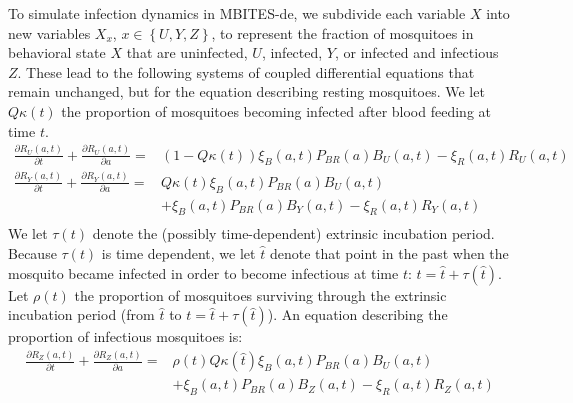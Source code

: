 \documentclass{article}
\begin{document}
To simulate infection dynamics in MBITES-de, we subdivide each variable $X$ into new variables $X_x$, $x \in \left\{ U, Y, Z \right\}$, to represent the fraction of mosquitoes in behavioral state $X$ that are uninfected, $U$, infected, $Y$, or infected and infectious $Z$.  These lead to the following systems of coupled differential equations that remain unchanged, but for the equation describing resting mosquitoes. We let  $Q\kappa(t)$ the proportion of mosquitoes becoming infected after blood feeding at time $t$. 
%
\begin{equation}\begin{array}{rl}
%
\frac{\partial R_U(a,t)}{\partial t} + \frac{\partial
R_U(a,t)}{\partial a} =& \left(1-Q \kappa(t) \right) \xi_B(a,t) P_{BR}(a) B_U(a,t)
- \xi_R(a,t) R_U(a,t)\\

\frac{\partial R_Y(a,t)}{\partial t} + \frac{\partial
R_Y(a,t)}{\partial a} =&  Q \kappa(t) \xi_B(a,t) P_{BR}(a) B_U(a,t)\\&
+ \xi_B(a,t) P_{BR}(a) B_Y(a,t) 
- \xi_R(a,t) R_Y(a,t)\\
\end{array}\end{equation}
%
We let $\tau(t)$ denote the (possibly time-dependent) extrinsic incubation period. Because $\tau(t)$ is time dependent, we let $\hat t$ denote that point in the past when the mosquito became infected in order to become infectious at time $t$: \ie $t = \hat t + \tau(\hat t)$. Let $\rho(t)$ the proportion of mosquitoes surviving through the extrinsic incubation period (\ie from $\hat t$ to $t = \hat t +\tau (\hat t)$). An equation describing the proportion of infectious mosquitoes is:
%
\begin{equation}\begin{array}{rl}
\frac{\partial R_Z(a,t)}{\partial t} + \frac{\partial
R_Z(a,t)}{\partial a} =&  \rho(t) Q \kappa \left( \hat t \right) \xi_B(a,t) P_{BR}(a) B_U(a,t) \\&
+ \xi_B(a,t) P_{BR}(a) B_Z(a,t)
- \xi_R(a,t) R_Z(a,t)\\
%
\end{array}\end{equation}
\end{document}
